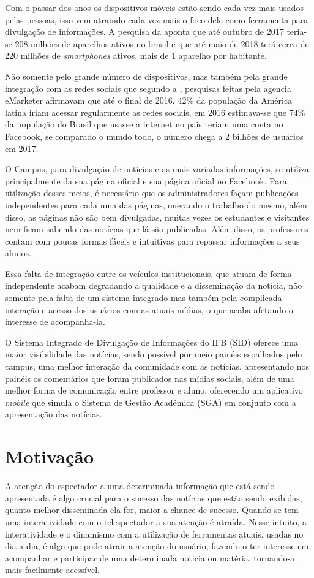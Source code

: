 Com o passar dos anos os dispositivos móveis estão sendo cada vez mais usados pelas pessoas, isso vem atraindo cada vez mais o foco dele como ferramenta para divulgação de informações. A pesquisa da \cite{fgv2017} aponta que até outubro de 2017 teria-se 208 milhões de aparelhos ativos no brasil e que até maio de 2018 terá cerca de 220 milhões de \textit{smartphones} ativos, mais de 1 aparelho por habitante. 

Não somente pelo grande número de dispositivos, mas também pela grande integração com as redes sociais que segundo a \cite{forbes2016}, pesquisas feitas pela agencia eMarketer afirmavam que até o final de 2016, 42\% da população da América latina iriam acessar regularmente as redes sociais, em 2016 estimava-se que 74\% da população do Brasil que usasse a internet no pais teriam uma conta no Facebook, se comparado o mundo todo, o número chega a 2 bilhões de usuários em 2017. 

O Campus, para divulgação de notícias e as mais variadas informações, se utiliza principalmente da sua página oficial e sua página oficial no Facebook. Para utilização desses meios, é necessário que os administradores façam publicações independentes para cada uma das páginas, onerando o trabalho do mesmo, além disso, as páginas não são bem divulgadas, muitas vezes os estudantes e visitantes nem ficam sabendo das notícias que lá são publicadas. Além disso, os professores contam com poucas formas fáceis e intuitivas para repassar informações a seus alunos.

Essa falta de integração entre os veículos institucionais, que atuam de forma independente acabam degradando a qualidade e a disseminação da notícia, não somente pela falta de um sistema integrado mas também pela complicada interação e acesso dos usuários com as atuais mídias, o que acaba afetando o interesse de acompanha-la.

O Sistema Integrado de Divulgação de Informações do IFB (SID) oferece uma maior visibilidade das notícias, sendo possível por meio painéis espalhados pelo campus, uma melhor interação da comunidade com as notícias, apresentando nos painéis os comentários que foram publicados nas mídias sociais, além de uma melhor forma de comunicação entre professor e aluno, oferecendo um aplicativo \textit{mobile} que simula o Sistema de Gestão Acadêmica (SGA) em conjunto com a apresentação das notícias.

\section{Motivação}
A atenção do espectador a uma determinada informação que está sendo apresentada é algo crucial para o sucesso das notícias que estão sendo exibidas, quanto melhor disseminada ela for, maior a chance de sucesso. Quando se tem uma interatividade com o telespectador a sua atenção é atraída. Nesse intuito, a interatividade e o dinamismo com a utilização de ferramentas atuais, usadas no dia a dia, é algo que pode atrair a atenção do usuário, fazendo-o ter interesse em acompanhar e participar de uma determinada noticia ou matéria, tornando-a mais facilmente acessível. 

